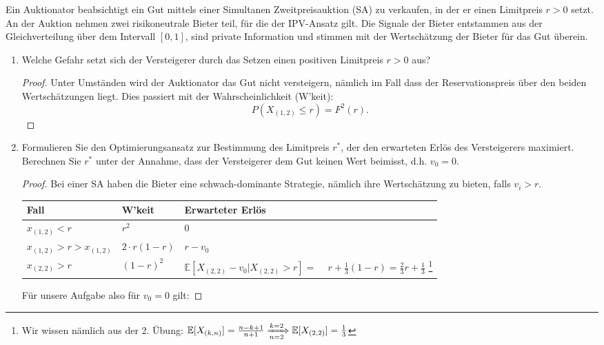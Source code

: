 \documentclass[12pt]{extreport} %
\theoremstyle{named}
\theoremstyle{itshape}
\theoremstyle{normal}
\begin{document}
Ein Auktionator beabsichtigt ein Gut mittels einer Simultanen Zweitpreisauktion (SA) zu verkaufen, in der er einen Limitpreis $r > 0$ setzt. An der Auktion nehmen zwei risikoneutrale Bieter teil, für die der IPV-Ansatz gilt. Die Signale der Bieter entstammen aus der Gleichverteilung über dem Intervall $[0, 1]$, sind private Information und stimmen mit der Wertschätzung der Bieter für das Gut überein.

\begin{enumerate}
	\item Welche Gefahr setzt sich der Versteigerer durch das Setzen einen positiven Limitpreis $r > 0$ aus?
		\begin{proof}
			Unter Umständen wird der Auktionator das Gut nicht versteigern, nämlich im Fall dass der Reservationspreis über den beiden Wertschätzungen liegt. Dies passiert mit der Wahrscheinlichkeit (W'keit):
			$$ P(X_{(1, 2)} \leq r) = F^{2}(r). $$
		\end{proof}
	\item Formulieren Sie den Optimierungsansatz zur Bestimmung des Limitpreis $r^{*}$, der den erwarteten Erlös des Versteigerers maximiert. Berechnen Sie $r^{*}$ unter der Annahme, dass der Versteigerer dem Gut keinen Wert beimisst, d.h. $v_{0} = 0$.
		\begin{proof}
			Bei einer SA haben die Bieter eine schwach-dominante Strategie, nämlich ihre Wertschätzung zu bieten, falls $v_{i} > r$.
			\begin{center}
    \begin{tabular}{| l | l | l |}
    \hline
    Fall & W'keit & Erwarteter Erlös  \\ \hline
    $x_{(1,2)} < r$ & $r^{2}$ & $0$  \\ \hline
    $x_{(1, 2)} > r > x_{(1, 2)} $ & $2 \cdot r (1 - r)$ & $r - v_{0}$  \\ \hline
    $x_{(2, 2)} > r$ & $(1-r)^{2} $  &  \pbox{20cm}{$\mathbb{E}[X_{(2,2)} - v_{0} \big| X_{(2,2)} > r] =$ \\ ~\hspace{0.25cm} $r + \frac{1}{3} (1-r) = \frac{2}{3} r + \frac{1}{3}$} \footnote{Wir wissen nämlich aus der 2. Übung: $\mathbb{E}[X_{(k, n)}] = \frac{n - k +1}{n+1} \xRightarrow[n=2]{k=2} \mathbb{E}[X_{(2,2)}] = \frac{1}{3}$}  \\ 
    \hline
    \end{tabular}
    \end{center}
   
    Für unsere Aufgabe also für $v_{0} = 0$ gilt:
    

\end{proof}
\end{enumerate}
\end{document}
